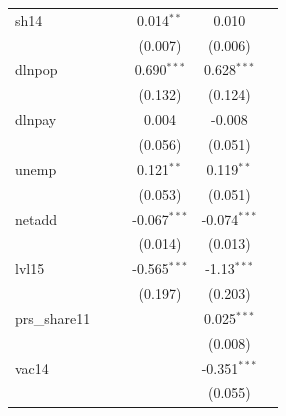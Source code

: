\begin{table}[htbp]
\begin{tabular}{lccccc}
      sh14                                       &               &              & 0.014$^{**}$   & 0.010          &   \\   
                                                 &               &              & (0.007)        & (0.006)        &   \\   
      dlnpop                                     &               &              & 0.690$^{***}$  & 0.628$^{***}$  &   \\   
                                                 &               &              & (0.132)        & (0.124)        &   \\   
      dlnpay                                     &               &              & 0.004          & -0.008         &   \\   
                                                 &               &              & (0.056)        & (0.051)        &   \\   
      unemp                                      &               &              & 0.121$^{**}$   & 0.119$^{**}$   &   \\   
                                                 &               &              & (0.053)        & (0.051)        &   \\   
      netadd                                     &               &              & -0.067$^{***}$ & -0.074$^{***}$ &   \\   
                                                 &               &              & (0.014)        & (0.013)        &   \\   
      lvl15                                      &               &              & -0.565$^{***}$ & -1.13$^{***}$  &   \\   
                                                 &               &              & (0.197)        & (0.203)        &   \\   
      prs\_share11                               &               &              &                & 0.025$^{***}$  &   \\   
                                                 &               &              &                & (0.008)        &   \\   
      vac14                                      &               &              &                & -0.351$^{***}$ &   \\   
                                                 &               &              &                & (0.055)        &   \\   

\end{tabular}
\end{table}
